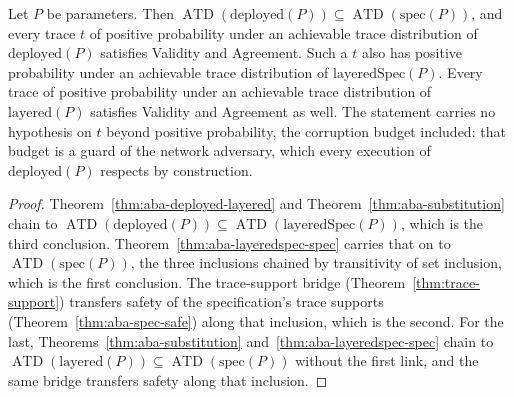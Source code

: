 \begin{theorem}
  \label{thm:aba-deployed}
  \leanok
  Let $P$ be parameters.
  Then $\operatorname{ATD}(\mathrm{deployed}(P)) \subseteq \operatorname{ATD}(\mathrm{spec}(P))$, and every trace $t$ of positive probability under an achievable trace distribution of $\mathrm{deployed}(P)$ satisfies Validity and Agreement.
  Such a $t$ also has positive probability under an achievable trace distribution of $\mathrm{layeredSpec}(P)$.
  Every trace of positive probability under an achievable trace distribution of $\mathrm{layered}(P)$ satisfies Validity and Agreement as well.
  The statement carries no hypothesis on $t$ beyond positive probability, the corruption budget included: that budget is a guard of the network adversary, which every execution of $\mathrm{deployed}(P)$ respects by construction.
\end{theorem}

\begin{proof}\leanok
  Theorem~\ref{thm:aba-deployed-layered} and Theorem~\ref{thm:aba-substitution} chain to $\operatorname{ATD}(\mathrm{deployed}(P)) \subseteq \operatorname{ATD}(\mathrm{layeredSpec}(P))$, which is the third conclusion.
  Theorem~\ref{thm:aba-layeredspec-spec} carries that on to $\operatorname{ATD}(\mathrm{spec}(P))$, the three inclusions chained by transitivity of set inclusion, which is the first conclusion.
  The trace-support bridge (Theorem~\ref{thm:trace-support}) transfers safety of the specification's trace supports (Theorem~\ref{thm:aba-spec-safe}) along that inclusion, which is the second.
  For the last, Theorems~\ref{thm:aba-substitution} and~\ref{thm:aba-layeredspec-spec} chain to $\operatorname{ATD}(\mathrm{layered}(P)) \subseteq \operatorname{ATD}(\mathrm{spec}(P))$ without the first link, and the same bridge transfers safety along that inclusion.
\end{proof}
